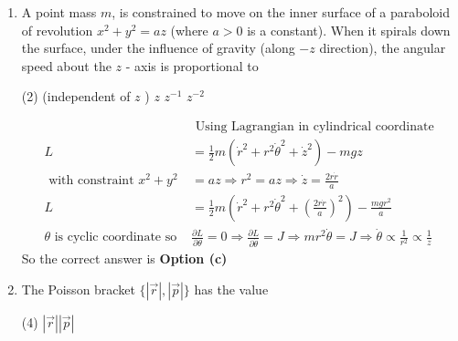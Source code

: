 \begin{enumerate}
\begin{answer}
$$\begin{aligned}
	p q&=A\hspace{2cm}(iii)\\
	&\text { from equation (i) }\\
	\frac{d p}{d t}&=-2 p^{2} q=-2 p A\\
	\Rightarrow \quad \int \frac{d p}{p}&=-\int 2 A d t+\ln B \Rightarrow \ln \frac{p}{B}=-2 A t \Rightarrow p=B e^{-2 A t}
\end{aligned}
$$
Putting this value of $p$ in equation (iii) gives $q=\frac{A}{B} e^{2 A t}$\\ Hence, the correct option is (a)\\
	So the correct answer is \textbf{Option (a)}
\end{answer}
\item A point mass $m$, is constrained to move on the inner surface of a paraboloid of revolution $x^{2}+y^{2}=a z$ (where $a>0$ is a constant). When it spirals down the surface, under the influence of gravity (along $-z$ direction), the angular speed about the $z$ - axis is proportional to
{}
 \begin{tasks}(2)
	 (independent of $z$ )
	\task[\textbf{b.}]$z$
	\task[\textbf{c.}]$z^{-1}$
	\task[\textbf{d.}]  $z^{-2}$
\end{tasks}
\begin{answer}
	$$
	\begin{aligned}
	&\text { Using Lagrangian in cylindrical coordinate }\\
	L&=\frac{1}{2} m\left(\dot{r}^{2}+r^{2} \dot{\theta}^{2}+\dot{z}^{2}\right)-m g z\\
	\text { with constraint } x^{2}+y^{2}&=a z \Rightarrow r^{2}=a z \Rightarrow \dot{z}=\frac{2 r \dot{r}}{a}\\
	L&=\frac{1}{2} m\left(\dot{r}^{2}+r^{2} \dot{\theta}^{2}+\left(\frac{2 r \dot{r}}{a}\right)^{2}\right)-\frac{m g r^{2}}{a}\\
	\theta \text { is cyclic coordinate so } &\frac{\partial L}{\partial \theta}=0 \Rightarrow \frac{\partial L}{\partial \dot{\theta}}=J \Rightarrow m r^{2} \dot{\theta}=J \Rightarrow \dot{\theta} \propto \frac{1}{r^{2}} \propto \frac{1}{z}
\end{aligned}
$$
	So the correct answer is \textbf{Option (c)}
\end{answer}
\item The Poisson bracket $\{|\vec{r}|,|\vec{p}|\}$ has the value
{}
 \begin{tasks}(4)
	\task[\textbf{a.}]$|\vec{r}||\vec{p}|$

\end{tasks}
\end{enumerate}
